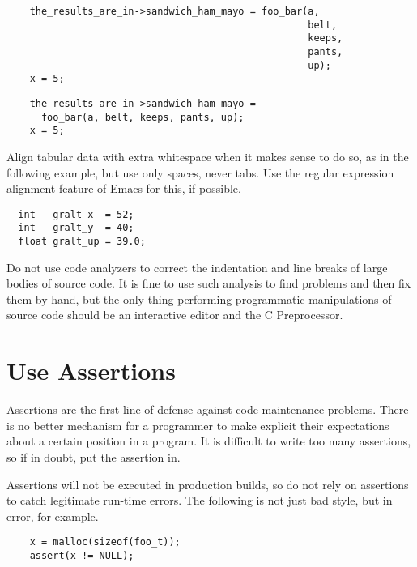 \documentclass{lulu}
\begin{document}
\begin{samepage}
\begin{verbatim}
    the_results_are_in->sandwich_ham_mayo = foo_bar(a,
                                                    belt,
                                                    keeps,
                                                    pants,
                                                    up);
    x = 5;
\end{verbatim}
\end{samepage}
\begin{samepage}
\begin{verbatim}
    the_results_are_in->sandwich_ham_mayo = 
      foo_bar(a, belt, keeps, pants, up);
    x = 5;
\end{verbatim}
\end{samepage}

Align tabular data with extra whitespace when it makes sense to do so,
as in the following example, but use only spaces, never tabs.  Use the
regular expression alignment feature of Emacs for this, if possible.

\begin{samepage}
\begin{verbatim}
  int   gralt_x  = 52;
  int   gralt_y  = 40;
  float gralt_up = 39.0;
\end{verbatim}
\end{samepage}

Do not use code analyzers to correct the indentation and line breaks
of large bodies of source code.  It is fine to use such analysis to
find problems and then fix them by hand, but the only thing performing
programmatic manipulations of source code should be an interactive
editor and the C Preprocessor.

\section{Use Assertions}

Assertions are the first line of defense against code maintenance
problems.  There is no better mechanism for a programmer to make
explicit their expectations about a certain position in a program.  It
is difficult to write too many assertions, so if in doubt, put the
assertion in.

Assertions will not be executed in production builds, so do not rely
on assertions to catch legitimate run-time errors.  The following is
not just bad style, but in error, for example.

\begin{samepage}
\begin{verbatim}
    x = malloc(sizeof(foo_t));
    assert(x != NULL);
\end{verbatim}
\end{samepage}
\end{document}
